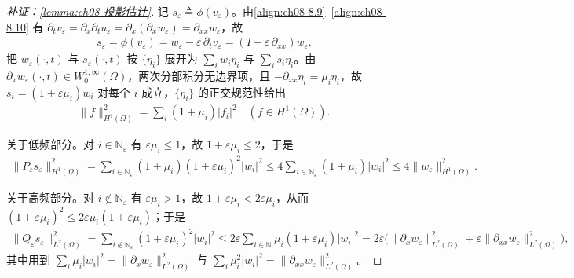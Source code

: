 \documentclass[../../main.tex]{subfiles}%
\begin{document}
\begin{proof}[补证：\cref{lemma:ch08-投影估计}]
记 $s_\varepsilon\triangleq\phi(v_\varepsilon)$。由\eqref{align:ch08-8.9}--\eqref{align:ch08-8.10} 有 $\partial_tv_\varepsilon=\partial_x\partial_tu_\varepsilon=\partial_x(\partial_xw_\varepsilon)=\partial_{xx}w_\varepsilon$，故
\begin{align*}
s_\varepsilon=\phi(v_\varepsilon)=w_\varepsilon-\varepsilon\,\partial_tv_\varepsilon=(I-\varepsilon\,\partial_{xx})w_\varepsilon.
\end{align*}
把 $w_\varepsilon(\cdot,t)$ 与 $s_\varepsilon(\cdot,t)$ 按 $\{\eta_i\}$ 展开为 $\sum_iw_i\eta_i$ 与 $\sum_is_i\eta_i$。由 $\partial_xw_\varepsilon(\cdot,t)\in W^{1,\infty}_0(\Omega)$，两次分部积分无边界项，且 $-\partial_{xx}\eta_i=\mu_i\eta_i$，故 $s_i=(1+\varepsilon\mu_i)w_i$ 对每个 $i$ 成立，$\{\eta_i\}$ 的正交规范性给出
\begin{align*}
\|f\|^2_{H^1(\Omega)}=\sum_i(1+\mu_i)|f_i|^2\quad(f\in H^1(\Omega)).
\end{align*}

关于低频部分。对 $i\in\mathbb{N}_\varepsilon$ 有 $\varepsilon\mu_i\leqslant1$，故 $1+\varepsilon\mu_i\leqslant2$，于是
\begin{align*}
\|P_\varepsilon s_\varepsilon\|^2_{H^1(\Omega)}
=\sum_{i\in\mathbb{N}_\varepsilon}(1+\mu_i)(1+\varepsilon\mu_i)^2|w_i|^2
\leqslant4\sum_{i\in\mathbb{N}_\varepsilon}(1+\mu_i)|w_i|^2
\leqslant4\|w_\varepsilon\|^2_{H^1(\Omega)}.
\end{align*}

关于高频部分。对 $i\notin\mathbb{N}_\varepsilon$ 有 $\varepsilon\mu_i>1$，故 $1+\varepsilon\mu_i<2\varepsilon\mu_i$，从而 $(1+\varepsilon\mu_i)^2\leqslant2\varepsilon\mu_i(1+\varepsilon\mu_i)$；于是
\begin{align*}
\|Q_\varepsilon s_\varepsilon\|^2_{L^2(\Omega)}
=\sum_{i\notin\mathbb{N}_\varepsilon}(1+\varepsilon\mu_i)^2|w_i|^2
\leqslant2\varepsilon\sum_{i\in\mathbb{N}}\mu_i(1+\varepsilon\mu_i)|w_i|^2
=2\varepsilon\bigl(\|\partial_xw_\varepsilon\|^2_{L^2(\Omega)}+\varepsilon\|\partial_{xx}w_\varepsilon\|^2_{L^2(\Omega)}\bigr),
\end{align*}
其中用到 $\sum_i\mu_i|w_i|^2=\|\partial_xw_\varepsilon\|^2_{L^2(\Omega)}$ 与 $\sum_i\mu_i^2|w_i|^2=\|\partial_{xx}w_\varepsilon\|^2_{L^2(\Omega)}$。


\end{proof}
\end{document}
